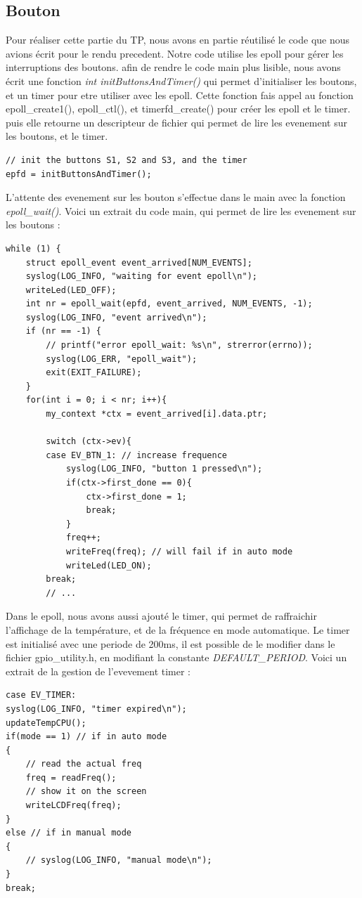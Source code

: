 \documentclass[
	a4paper, %
	10pt, %
]{CSUniSchoolLabReport}
\begin{document}
\subsection{Bouton}\label{Bouton}
Pour réaliser cette partie du TP, nous avons en partie réutilisé le code que nous avions écrit pour le rendu precedent.
Notre code utilise les epoll pour gérer les interruptions des boutons.
afin de rendre le code main plus lisible, nous avons écrit une fonction \textit{int initButtonsAndTimer()} qui permet d'initialiser les boutons, et un timer pour etre utiliser avec les epoll.
Cette fonction fais appel au fonction epoll\_create1(), epoll\_ctl(), et timerfd\_create() pour créer les epoll et le timer.
puis elle retourne un descripteur de fichier qui permet de lire les evenement sur les boutons, et le timer.
\begin{lstlisting}[style=CStyle]
// init the buttons S1, S2 and S3, and the timer
epfd = initButtonsAndTimer();
\end{lstlisting}
L'attente des evenement sur les bouton s'effectue dans le main avec la fonction \textit{epoll\_wait()}.
Voici un extrait du code main, qui permet de lire les evenement sur les boutons : \\
\begin{lstlisting}[style=CStyle]
while (1) {
	struct epoll_event event_arrived[NUM_EVENTS];
	syslog(LOG_INFO, "waiting for event epoll\n");
	writeLed(LED_OFF);
	int nr = epoll_wait(epfd, event_arrived, NUM_EVENTS, -1);
	syslog(LOG_INFO, "event arrived\n");
	if (nr == -1) {
		// printf("error epoll_wait: %s\n", strerror(errno));
		syslog(LOG_ERR, "epoll_wait");
		exit(EXIT_FAILURE);
	}
	for(int i = 0; i < nr; i++){
		my_context *ctx = event_arrived[i].data.ptr;

		switch (ctx->ev){
		case EV_BTN_1: // increase frequence
			syslog(LOG_INFO, "button 1 pressed\n");
			if(ctx->first_done == 0){
				ctx->first_done = 1;
				break;
			}
			freq++;
			writeFreq(freq); // will fail if in auto mode
			writeLed(LED_ON);
		break;
		// ...
\end{lstlisting}

Dans le epoll, nous avons aussi ajouté le timer, qui permet de raffraichir l'affichage de la température, et de la fréquence en mode automatique.
Le timer est initialisé avec une periode de 200ms, il est possible de le modifier dans le fichier gpio\_utility.h, en modifiant la constante \textit{DEFAULT\_PERIOD}.
Voici un extrait de la gestion de l'evevement timer : \\
\begin{lstlisting}[style=CStyle]
case EV_TIMER:
syslog(LOG_INFO, "timer expired\n");
updateTempCPU();
if(mode == 1) // if in auto mode
{
	// read the actual freq
	freq = readFreq();
	// show it on the screen
	writeLCDFreq(freq); 
}
else // if in manual mode
{
	// syslog(LOG_INFO, "manual mode\n");
}
break;
\end{lstlisting}
\end{document}

